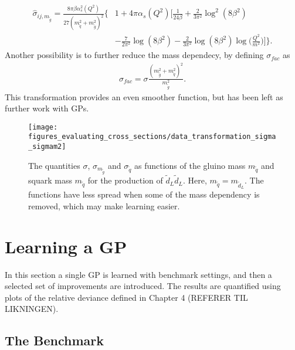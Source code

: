 \documentclass[twoside,english]{uiofysmaster}
\begin{document}
\begin{align}
\hat{\sigma}_{ij, m_{\tilde{g}}} =  \frac{8 \pi \beta \alpha^2_s (Q^2)}{27(m_{\tilde{q}}^2 + m_{\tilde{g}}^2)^2} \Bigg\{&1 
 + 4 \pi \alpha_s (Q^2) \Bigg[ \frac{1}{24 \beta} 
 + \frac{2}{3 \pi^2} \log^2(8 \beta^2)\\& - \frac{7}{2 \pi^2} \log (8 \beta^2)
- \frac{2}{3 \pi^2} \log (8 \beta^2) \log \Big( \frac{Q^2}{m^2} \Big) \Bigg] \Bigg\}.
\end{align}
Another possibility is to further reduce the mass dependecy, by defining $\sigma_{fac}$ as 
\begin{align}
\sigma_{fac} = \sigma \frac{(m_{\tilde{g}}^2 + m_{\tilde{q}}^2)^2}{m_{\tilde{g}}^2}.
\end{align}
This transformation provides an even smoother function, but has been left as further work with GPs.

\begin{figure}
\centering
\texttt{[image: figures\_evaluating\_cross\_sections/data\_transformation\_sigma\_sigmam2]}
\caption{The quantities $\sigma$, $\sigma_{m_{\tilde{g}}}$ and $\sigma_{\tilde{q}}$ as functions of the gluino mass $m_{\tilde{q}}$ and squark mass $m_{\tilde{q}}$ for the production of $\tilde{d}_L \tilde{d}_L$. Here, $m_{\tilde{q}} = m_{\tilde{d}_L}$. The functions have less spread when some of the mass dependency is removed, which may make learning easier.}
\label{Fig:: evaluating cross : Comparison sigma and sigma/m}
\end{figure}

\section{Learning a GP}

In this section a single GP is learned with benchmark settings, and then a selected set of improvements are introduced. The results are quantified using plots of the relative deviance defined in Chapter 4 (REFERER TIL LIKNINGEN).

\subsection{The Benchmark}
\end{document}
